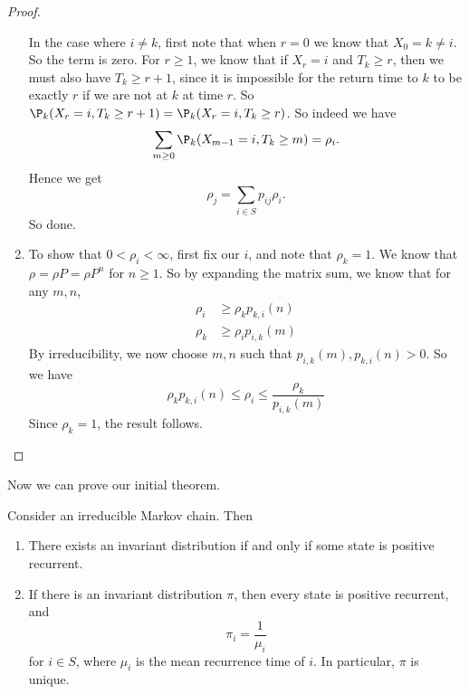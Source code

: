 \documentclass[a4paper]{article}
\begin{document}
\begin{proof}
\begin{enumerate}
      In the case where $i \not= k$, first note that when $r = 0$ we know that $X_0 = k \not= i$. So the term is zero. For $r \geq 1$, we know that if $X_r = i$ and $T_k \geq r$, then we must also have $T_k \geq r + 1$, since it is impossible for the return time to $k$ to be exactly $r$ if we are not at $k$ at time $r$. So $\P_k(X_r = i , T_k \geq r + 1) = \P_k(X_r = i, T_k \geq r)$. So indeed we have
      \[
        \sum_{m \geq 0} \P_k (X_{m - 1} = i, T_k \geq m) = \rho_i.
      \]
      Hence we get
      \[
        \rho_j = \sum_{i \in S} p_{ij} \rho_i.
      \]
      So done.

    \item To show that $0 < \rho_i < \infty$, first fix our $i$, and note that $\rho_k = 1$. We know that $\rho = \rho P = \rho P^n$ for $n \geq 1$. So by expanding the matrix sum, we know that for any $m, n$,
      \begin{align*}
        \rho_i &\geq \rho_k p_{k, i}(n)\\
        \rho_k &\geq \rho_i p_{i, k}(m)
      \end{align*}
      By irreducibility, we now choose $m, n$ such that $p_{i, k}(m), p_{k, i}(n) > 0$. So we have
      \[
        \rho_k p_{k, i}(n) \leq \rho_i \leq \frac{\rho_k}{p_{i, k}(m)}
      \]
      Since $\rho_k = 1$, the result follows.

  \end{enumerate}
\end{proof}

Now we can prove our initial theorem.
\begin{thm}
  Consider an irreducible Markov chain. Then
  \begin{enumerate}
    \item There exists an invariant distribution if and only if some state is positive recurrent.
    \item If there is an invariant distribution $\pi$, then every state is positive recurrent, and
      \[
        \pi_i = \frac{1}{\mu_i}
      \]
      for $i \in S$, where $\mu_i$ is the mean recurrence time of $i$. In particular, $\pi$ is unique.
  \end{enumerate}
\end{thm}
\end{document}
